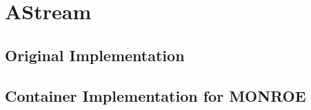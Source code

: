 
\section{AStream}\label{sec:astream}

\subsection{Original Implementation}

\subsection{Container Implementation for \ac{MONROE}}